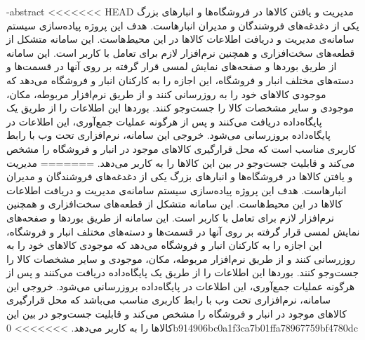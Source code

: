 

\fa-abstract{
<<<<<<< HEAD
مدیریت و یافتن کالاها در فروشگاه‌ها و انبار‌های بزرگ یکی از دغدغه‌های فروشندگان و مدیران انبارهاست. هدف این پروژه پیاده‌سازی سیستم سامانه‌ی مدیریت و دریافت اطلاعات کالاها در این محیط‌هاست. این سامانه متشکل از قطعه‌های سخت‌افزاری و همچنین نرم‌افزار لازم برای تعامل با کاربر است. این سامانه از طریق بوردها و صفحه‌های نمایش لمسی قرار گرفته بر روی آنها در قسمت‌ها و دسته‌های مختلف انبار و فروشگاه، این اجازه را به کارکنان انبار و فروشگاه می‌دهد که موجودی کالا‌های خود را به روز‌رسانی کنند و از طریق نرم‌افزار مربوطه، مکان، موجودی و سایر مشخصات کالا را جست‌و‌جو کنند. بوردها این اطلاعات را از طریق یک پایگاه‌داده دریافت می‌کنند و پس از هرگونه عملیات جمع‌آوری، این اطلاعات در پایگاه‌داده بروزرسانی می‌شود. خروجی این سامانه، نرم‌افزاری تحت وب با رابط کاربری مناسب است که محل قرارگیری کالا‌های موجود در انبار و فروشگاه را مشخص می‌کند و قابلیت جست‌و‌جو در بین این کالا‌ها را به کاربر می‌دهد.
=======
مدیریت و یافتن کالاها در فروشگاه‌ها و انبار‌های بزرگ یکی از دغدغه‌های فروشندگان و مدیران انبارهاست. هدف این پروژه پیاده‌سازی سیستم سامانه‌ی مدیریت و دریافت اطلاعات کالاها در این محیط‌هاست. این سامانه متشکل از قطعه‌های سخت‌افزاری و همچنین نرم‌افزار لازم برای تعامل با کاربر است. این سامانه از طریق بوردها و صفحه‌های نمایش لمسی قرار گرفته بر روی آنها در قسمت‌ها و دسته‌های مختلف انبار و فروشگاه، این اجازه را به کارکنان انبار و فروشگاه می‌دهد که موجودی کالا‌های خود را به روز‌رسانی کنند و از طریق نرم‌افزار مربوطه، مکان، موجودی و سایر مشخصات کالا را جست‌و‌جو کنند. بوردها این اطلاعات را از طریق یک پایگاه‌داده دریافت می‌کنند و پس از هرگونه عملیات جمع‌آوری، این اطلاعات در پایگاه‌داده بروزرسانی می‌شود. خروجی این سامانه، نرم‌افزاری تحت وب با رابط کاربری مناسب ‌می‌باشد که محل قرارگیری کالا‌های موجود در انبار و فروشگاه را مشخص می‌کند و قابلیت جست‌و‌جو در بین این کالا‌ها را به کاربر می‌دهد.
>>>>>>> 0b914906bc0a1f3ca7b01ffa78967759bf4780dc
}

